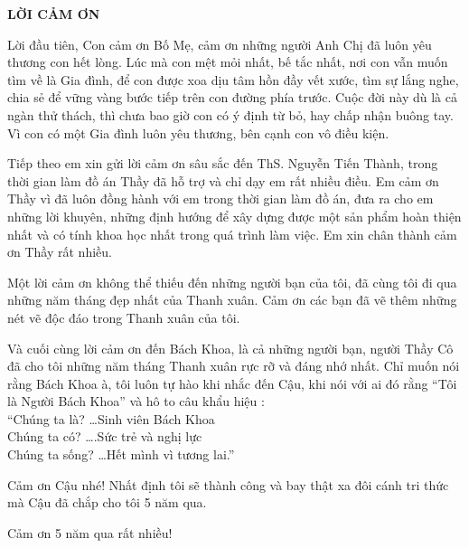 \documentclass[../DoAn.tex]{subfiles}
\begin{document}
\begin{center}
    \Large{\textbf{LỜI CẢM ƠN}}\\
\end{center}
\vspace{1cm}
Lời đầu tiên, Con cảm ơn Bố Mẹ, cảm ơn những người Anh Chị đã luôn yêu thương con hết lòng. Lúc mà con mệt mỏi nhất, bế tắc nhất, nơi con vẫn muốn tìm về là Gia đình, để con được xoa dịu tâm hồn đầy vết xước, tìm sự lắng nghe, chia sẻ để vững vàng bước tiếp trên con đường phía trước. Cuộc đời này dù là cả ngàn thử thách, thì chưa bao giờ con có ý định từ bỏ, hay chấp nhận buông tay. Vì con có một Gia đình luôn yêu thương, bên cạnh con vô điều kiện.

Tiếp theo em xin gửi lời cảm ơn sâu sắc đến ThS. Nguyễn Tiến Thành, trong thời gian làm đồ án Thầy đã hỗ trợ và chỉ dạy em rất nhiều điều. Em cảm ơn Thầy vì đã luôn đồng hành với em trong thời gian làm đồ án, đưa ra cho em những lời khuyên, những định hướng để xây dựng được một sản phẩm hoàn thiện nhất và có tính khoa học nhất trong quá trình làm việc. Em xin chân thành cảm ơn Thầy rất nhiều.

Một lời cảm ơn không thể thiếu đến những người bạn của tôi, đã cùng tôi đi qua những năm tháng đẹp nhất của Thanh xuân. Cảm ơn các bạn đã vẽ thêm những nét vẽ độc đáo trong Thanh xuân của tôi.

Và cuối cùng lời cảm ơn đến Bách Khoa, là cả những người bạn, người Thầy Cô đã cho tôi những năm tháng Thanh xuân rực rỡ và đáng nhớ nhất. Chỉ muốn nói rằng Bách Khoa à, tôi luôn tự hào khi nhắc đến Cậu, khi nói với ai đó rằng “Tôi là Người Bách Khoa” và hô to câu khẩu hiệu :\\
“Chúng ta là? …Sinh viên Bách Khoa\\
Chúng ta có? ….Sức trẻ và nghị lực\\
Chúng ta sống? …Hết mình vì tương lai.”

Cảm ơn Cậu nhé! Nhất định tôi sẽ thành công và bay thật xa đôi cánh tri thức mà Cậu đã chắp cho tôi 5 năm qua. 

Cảm ơn 5 năm qua rất nhiều!
\end{document}
